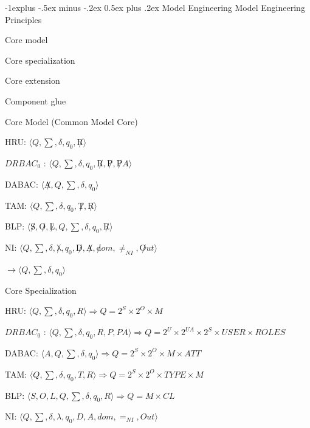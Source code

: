 \documentclass[a4paper]{article}
\makeatletter
\renewcommand{\subsection}{\@startsection{subsection}{2}{0mm}%
                                {-1explus -.5ex minus -.2ex}%
                                {0.5ex plus .2ex}%
                                {\normalfont\normalsize\bfseries}}
\makeatother
\begin{document}
\begin{multicols}{3}
    \subsection{Model Engineering}
    Model Engineering Principles
    \begin{itemize*}
        \item Core model
        \item Core specialization
        \item Core extension
        \item Component glue
    \end{itemize*}

    Core Model (Common Model Core)
    \begin{itemize*}
        \item HRU: $\langle  Q, \sum , \delta, q_0  , \not R \rangle$
        \item $DRBAC_0$ : $\langle  Q, \sum , \delta, q_0  , \not R, \not P, \not PA \rangle$
        \item DABAC: $\langle  \not A , Q ,\sum , \delta, q_0  \rangle$
        \item TAM: $\langle  Q , \sum , \delta, q_0  , \not T, \not R \rangle$
        \item BLP: $\langle  \not S, \not O, \not L, Q , \sum , \delta, q_0  , \not R \rangle$
        \item NI: $\langle  Q , \sum , \delta, \not \lambda ,q_0  , \not D, \not A, \not dom, \not =_{NI} , \not Out \rangle$
        \item $\rightarrow  \langle  Q ,\sum , \delta, q_0  \rangle$
    \end{itemize*}

    Core Specialization
    \begin{itemize*}
        \item HRU: $\langle  Q, \sum , \delta, q_0  , R \rangle  \Rightarrow Q = 2^S \times  2^O \times M$
        \item $DRBAC_0$ : $\langle  Q, \sum , \delta, q_0  , R, P, PA \rangle  \Rightarrow Q = 2^U\times 2^{UA}\times 2^S \times  USER \times  ROLES$
        \item DABAC: $\langle  A , Q ,\sum , \delta, q_0  \rangle  \Rightarrow Q = 2^S\times 2^O \times M\times ATT$
        \item TAM: $\langle  Q , \sum , \delta, q_0  , T, R \rangle  \Rightarrow Q = 2^S\times 2^O\times TYPE \times M$
        \item BLP: $\langle  S, O, L, Q , \sum , \delta, q_0  , R \rangle  \Rightarrow Q = M \times CL$
        \item NI: $\langle  Q , \sum , \delta, \lambda ,q_0  , D, A, dom, =_{NI} , Out \rangle$
    \end{itemize*}


\end{multicols}
\end{document}
